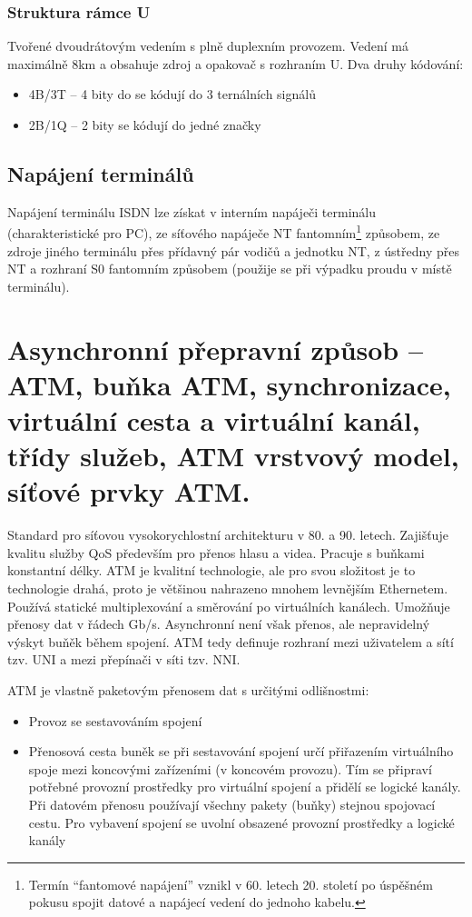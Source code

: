 \subsubsection{Struktura rámce U}

Tvořené dvoudrátovým vedením s plně duplexním provozem. Vedení má maximálně 8km a obsahuje zdroj a opakovač s rozhraním U. Dva druhy kódování:
\begin{itemize}
    \item 4B/3T -- 4 bity do se kódují do 3 ternálních signálů
    \item 2B/1Q -- 2 bity se kódují do jedné značky
\end{itemize}

\subsection{Napájení terminálů}
Napájení terminálu ISDN lze získat v interním napáječi terminálu (charakteristické pro PC), ze síťového napáječe NT fantomním\footnote{Termín \enquote{fantomové napájení} vznikl v 60. letech 20. století po úspěšném pokusu spojit datové a napájecí vedení do jednoho kabelu.} způsobem, ze zdroje jiného terminálu přes přídavný pár vodičů a jednotku NT, z ústředny přes NT a rozhraní S0 fantomním způsobem (použije se při výpadku proudu v místě terminálu).

\clearpage
\section{Asynchronní přepravní způsob -- ATM, buňka ATM, synchronizace, virtuální cesta a virtuální kanál, třídy služeb, ATM vrstvový model, síťové prvky ATM.}

Standard pro síťovou vysokorychlostní architekturu v 80. a 90. letech. Zajišťuje kvalitu služby QoS především pro přenos hlasu a videa. Pracuje s buňkami konstantní délky. ATM je kvalitní technologie, ale pro svou složitost je to technologie drahá, proto je většinou nahrazeno mnohem levnějším Ethernetem. Používá statické multiplexování a směrování po virtuálních kanálech. Umožňuje přenosy dat v řádech Gb/s. Asynchronní není však přenos, ale nepravidelný výskyt buňěk během spojení. ATM tedy definuje rozhraní mezi uživatelem a sítí tzv. UNI a mezi přepínači v síti tzv. NNI.

ATM je vlastně paketovým přenosem dat s určitými odlišnostmi:
\begin{itemize}
    \item Provoz se sestavováním spojení
    \item Přenosová cesta buněk se při sestavování spojení určí přiřazením virtuálního spoje mezi koncovými zařízeními (v koncovém provozu). Tím se připraví potřebné provozní prostředky pro virtuální spojení a přidělí se logické kanály. Při datovém přenosu používají všechny pakety (buňky) stejnou spojovací cestu. Pro vybavení spojení se uvolní obsazené provozní prostředky a logické kanály
\end{itemize}


